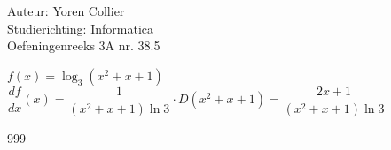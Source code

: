 \documentclass[a4paper]{article}
\newcommand{\Lh}{\left(} %
\newcommand{\Rh}{\right)}
\begin{document}
\noindent \large Auteur: Yoren Collier \\
\noindent \large Studierichting: Informatica\\
\noindent \large Oefeningenreeks 3A nr. 38.5\\

\medskip

\normalsize

$f(x) = \log_3 \Lh x^2+x+1 \Rh $\\

$\dfrac{df}{dx}(x) = \dfrac{1}{\Lh x^2 +x +1 \Rh \ln{3}} \cdot D\Lh x^2 +x +1\Rh = \dfrac{2x+1}{\Lh x^2 +x +1 \Rh \ln{3}}$\\

\begin{thebibliography}{999}
\end{thebibliography}
\end{document}
